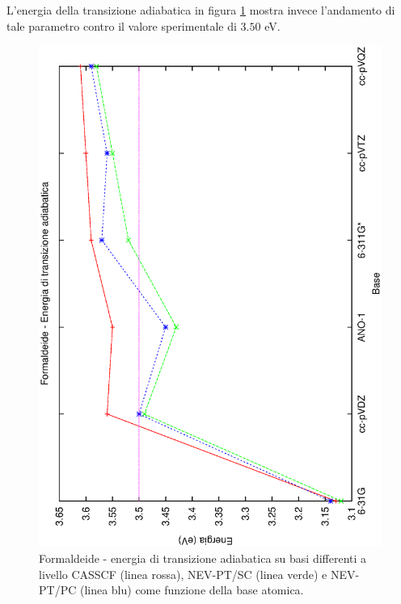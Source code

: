 L'energia della transizione adiabatica in figura
\ref{fig:formaldeide_energie_adiab} mostra invece l'andamento di tale
parametro contro il valore sperimentale di $3.50$ eV.

\begin{figure}[ht]
\begin{center}
\includegraphics[angle=270,width=12cm,keepaspectratio]{immagini/formaldeide/energie_adiab.eps}
\parbox[h]{12cm}{
\caption{\small Formaldeide - energia di transizione adiabatica su basi differenti a livello CASSCF (linea rossa), NEV-PT/SC (linea verde) e NEV-PT/PC (linea blu) come funzione della base atomica.}
\label{fig:formaldeide_energie_adiab}
}
\end{center}
\end{figure}

\clearpage

